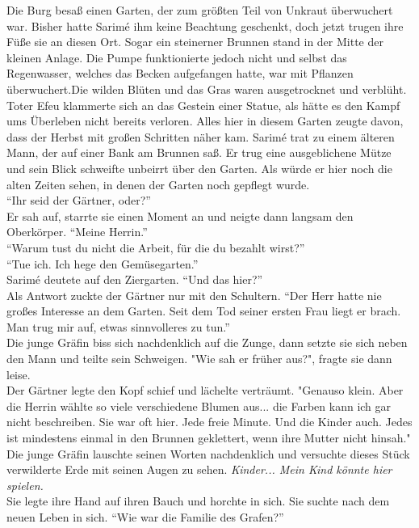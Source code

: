 Die Burg besaß einen Garten, der zum größten Teil von Unkraut überwuchert war. Bisher hatte Sarimé 
ihm keine Beachtung geschenkt, doch jetzt trugen ihre Füße sie an diesen Ort. Sogar ein steinerner 
Brunnen stand in der Mitte der kleinen Anlage. Die Pumpe funktionierte jedoch nicht und selbst das 
Regenwasser, welches das Becken aufgefangen hatte, war mit Pflanzen überwuchert.Die wilden Blüten 
und das Gras waren ausgetrocknet und verblüht. Toter Efeu klammerte sich an das Gestein einer 
Statue, als hätte es den Kampf ums Überleben nicht bereits verloren. Alles hier in diesem Garten 
zeugte davon, dass der Herbst mit großen Schritten näher kam. Sarimé trat zu einem älteren Mann, 
der auf einer Bank am Brunnen saß. Er trug eine ausgeblichene Mütze und sein Blick schweifte 
unbeirrt über den Garten. Als würde er hier noch die alten Zeiten sehen, in denen der Garten noch 
gepflegt wurde.\\
``Ihr seid der Gärtner, oder?''\\
Er sah auf, starrte sie einen Moment an und neigte dann langsam den Oberkörper. ``Meine Herrin.''\\
``Warum tust du nicht die Arbeit, für die du bezahlt wirst?''\\
``Tue ich. Ich hege den Gemüsegarten.''\\
Sarimé deutete auf den Ziergarten. ``Und das hier?''\\
Als Antwort zuckte der Gärtner nur mit den Schultern. ``Der Herr hatte nie großes Interesse an dem 
Garten. Seit dem Tod seiner ersten Frau liegt er brach. Man trug mir auf, etwas sinnvolleres zu 
tun.''\\
Die junge Gräfin biss sich nachdenklich auf die Zunge, dann setzte sie sich neben den Mann und 
teilte sein Schweigen. "Wie sah er früher aus?", fragte sie dann leise.\\
Der Gärtner legte den Kopf schief und lächelte verträumt. "Genauso klein. Aber die Herrin wählte so 
viele verschiedene Blumen aus... die Farben kann ich gar nicht beschreiben. Sie war oft hier. Jede 
freie Minute. Und die Kinder auch. Jedes ist mindestens einmal in den Brunnen geklettert, wenn ihre 
Mutter nicht hinsah."\\
Die junge Gräfin lauschte seinen Worten nachdenklich und versuchte dieses Stück verwilderte Erde 
mit seinen Augen zu sehen. \textit{Kinder... Mein Kind könnte hier spielen.}\\
Sie legte ihre Hand auf ihren Bauch und horchte in sich. Sie suchte nach dem neuen Leben in 
sich. ``Wie war die Familie des Grafen?''\\
